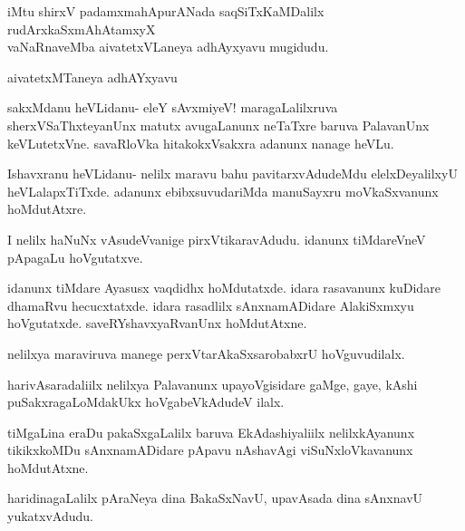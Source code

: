 \documentclass{article}
\begin{document}
\begin{center}
iMtu shirxV padamxmahApurANada saqSiTxKaMDalilx rudArxkaSxmAhAtamxyX\\
vaNaRnaveMba aivatetxVLaneya adhAyxyavu mugidudu.
\end{center}

\begin{center}
{\textbf\large{aivatetxMTaneya adhAYxyavu}}
\end{center}

\begin{mng}%
sakxMdanu heVLidanu- eleY sAvxmiyeV! maragaLalilxruva 
sherxVSaThxteyanUnx matutx avugaLanunx neTaTxre baruva PalavanUnx 
keVLutetxVne. savaRloVka hitakokxVsakxra adanunx nanage heVLu.
\end{mng}

\begin{mng}%
Ishavxranu heVLidanu- nelilx maravu bahu pavitarxvAdudeMdu 
elelxDeyalilxyU heVLalapxTiTxde. adanunx ebibxsuvudariMda manuSayxru 
moVkaSxvanunx hoMdutAtxre.
\end{mng}

\begin{mng}%
I nelilx haNuNx vAsudeVvanige pirxVtikaravAdudu. idanunx tiMdareVneV 
pApagaLu hoVgutatxve.
\end{mng}

\begin{mng}%
idanunx tiMdare Ayasusx vaqdidhx hoMdutatxde. idara rasavanunx 
kuDidare dhamaRvu hecucxtatxde. idara rasadlilx sAnxnamADidare 
AlakiSxmxyu hoVgutatxde. saveRYshavxyaRvanUnx hoMdutAtxne.
\end{mng}

\begin{mng}%
nelilxya maraviruva manege perxVtarAkaSxsarobabxrU hoVguvudilalx.
\end{mng}

\begin{mng}%
harivAsaradaliilx nelilxya Palavanunx upayoVgisidare gaMge, gaye, 
kAshi puSakxragaLoMdakUkx hoVgabeVkAdudeV ilalx.
\end{mng}

\begin{mng}%
tiMgaLina eraDu pakaSxgaLalilx baruva EkAdashiyaliilx nelilxkAyanunx 
tikikxkoMDu sAnxnamADidare pApavu nAshavAgi viSuNxloVkavanunx 
hoMdutAtxne.
\end{mng}

\begin{mng}%
haridinagaLalilx pAraNeya dina BakaSxNavU, upavAsada dina sAnxnavU 
yukatxvAdudu.
\end{mng}
\end{document}

